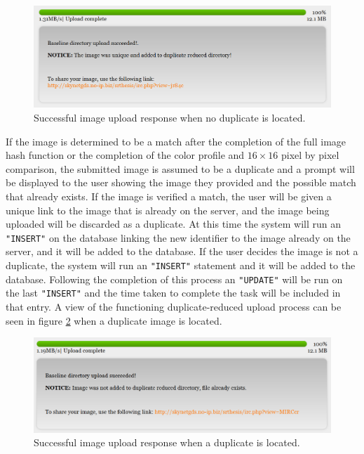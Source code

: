 \begin{figure}[htbp]
\centering
\includegraphics[width=5.5in]{success_nodupfound}
\caption{Successful image upload response when no duplicate is located.}
\label{success_nodupfound}
\end{figure}

If the image is determined to be a match after the completion of the full image hash function or the completion of the color profile and $16\times16$ pixel by pixel comparison, the submitted image is assumed to be a duplicate and a prompt will be displayed to the user showing the image they provided and the possible match that already exists. If the image is verified a match, the user will be given a unique link to the image that is already on the server, and the image being uploaded will be discarded as a duplicate. At this time the system will run an {\tt "INSERT"} on the database linking the new identifier to the image already on the server, and it will be added to the database. If the user decides the image is not a duplicate, the system will run an {\tt "INSERT"} statement and it will be added to the database. Following the completion of this process an {\tt "UPDATE"} will be run on the last {\tt "INSERT"} and the time taken to complete the task will be included in that entry. A view of the functioning duplicate-reduced upload process can be seen in figure \ref{success_dupfound} when a duplicate image is located.

\begin{figure}[htbp]
\centering
\includegraphics[width=5.5in]{success_dupfound}
\caption{Successful image upload response when a duplicate is located.}
\label{success_dupfound}
\end{figure}

